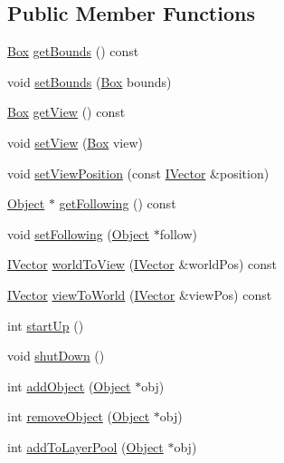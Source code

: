 \subsection*{Public Member Functions}
\begin{DoxyCompactItemize}
\item 
\hyperlink{class_box}{Box} \hyperlink{class_world_manager_a035099ac90a1f8cf0feb1650e02b3b7a}{get\+Bounds} () const 
\item 
void \hyperlink{class_world_manager_a4e39ad0a294f62d834a7e58f676fe5e6}{set\+Bounds} (\hyperlink{class_box}{Box} bounds)
\item 
\hyperlink{class_box}{Box} \hyperlink{class_world_manager_a54a25642fa5f666c7e6b8e3d668e13b3}{get\+View} () const 
\item 
void \hyperlink{class_world_manager_a2513ce622a4fbb25c3dd3139a9445fec}{set\+View} (\hyperlink{class_box}{Box} view)
\item 
void \hyperlink{class_world_manager_adb4eb19ce21ccad04c60e845f4c508a9}{set\+View\+Position} (const \hyperlink{class_i_vector}{I\+Vector} \&position)
\item 
\hyperlink{class_object}{Object} $\ast$ \hyperlink{class_world_manager_aca77cd8dd87db0e454817668b2d0e8ab}{get\+Following} () const 
\item 
void \hyperlink{class_world_manager_a0d29ce2f7ad696283e80e3fd13b5b077}{set\+Following} (\hyperlink{class_object}{Object} $\ast$follow)
\item 
\hyperlink{class_i_vector}{I\+Vector} \hyperlink{class_world_manager_adb6dd142eb66b01eb5104ab496c9517a}{world\+To\+View} (\hyperlink{class_i_vector}{I\+Vector} \&world\+Pos) const 
\item 
\hyperlink{class_i_vector}{I\+Vector} \hyperlink{class_world_manager_abdffd332d31f310f192a3b017d0940ca}{view\+To\+World} (\hyperlink{class_i_vector}{I\+Vector} \&view\+Pos) const 
\item 
int \hyperlink{class_world_manager_a7ad9c0bf4968b08b82d7d7daa159943a}{start\+Up} ()
\item 
void \hyperlink{class_world_manager_a94c6c0dae961c535b6f2f543e029d6b6}{shut\+Down} ()
\item 
int \hyperlink{class_world_manager_aa578d092a54953c07ff31908239db4ba}{add\+Object} (\hyperlink{class_object}{Object} $\ast$obj)
\item 
int \hyperlink{class_world_manager_a31f902aa5a2ece9e2213d9ca9612e783}{remove\+Object} (\hyperlink{class_object}{Object} $\ast$obj)
\item 
int \hyperlink{class_world_manager_a9dfc6db89285c0ff0191e80f238968c4}{add\+To\+Layer\+Pool} (\hyperlink{class_object}{Object} $\ast$obj)

\end{DoxyCompactItemize}
